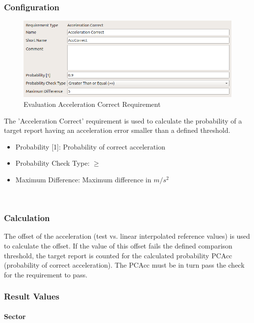 \subsubsection{Configuration}

\begin{figure}[H]
    \includegraphics[width=14cm,frame]{figures/eval_req_acceleration.png}
  \caption{Evaluation Acceleration Correct Requirement}
\end{figure}

The ’Acceleration Correct’ requirement is used to calculate the probability of a target report having an acceleration error smaller than a defined threshold. 

\begin{itemize}  
\item Probability [1]: Probability of correct acceleration
\item Probability Check Type: $\geq$
\item Maximum Difference: Maximum difference in $m/s^2$
\end{itemize}
\ \\

\subsubsection{Calculation}

The offset of the acceleration (test vs. linear interpolated reference values) is used to calculate the offset. If the value of this offset fails the defined comparison threshold, the target report is counted for the calculated probability PCAcc (probability of correct acceleration). The PCAcc must be in turn pass the check for the requirement to pass. 

\subsubsection{Result Values}

\paragraph{Sector}

